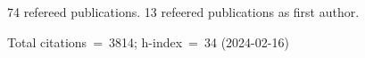 74 refereed publications. 13 refeered publications as first author.

Total citations~=~3814; h-index~=~34 (2024-02-16)